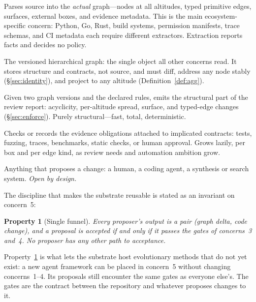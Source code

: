 \documentclass[sigconf,review,anonymous]{acmart}
\theoremstyle{plain}
\newtheorem{property}[theorem]{Property}
\theoremstyle{definition}
\begin{document}
\begin{description}[leftmargin=0em,itemsep=2pt,topsep=2pt,style=nextline]
\item[\textsf{1.\ Extraction} (language $\to$ graph)] Parses source into the
\emph{actual} graph---nodes at all altitudes, typed primitive edges, surfaces,
external boxes, and evidence metadata. This is the main ecosystem-specific
concern: Python, Go, Rust, build systems, permission manifests, trace schemas,
and CI metadata each require different extractors. Extraction reports facts and
decides no policy.
\item[\textsf{2.\ Representation} (the artifact)] The versioned hierarchical
graph: the single object all other concerns read. It stores structure and
contracts, not source, and must diff, address any node stably
(\S\ref{sec:identity}), and project to any altitude (Definition~\ref{def:agg}).
\item[\textsf{3.\ Conformance} (structural gate)] Given two graph versions and
the declared rules, emits the structural part of the review report:
acyclicity, per-altitude spread, surface, and typed-edge changes
(\S\ref{sec:enforce}). Purely structural---fast, total, deterministic.
\item[\textsf{4.\ Evidence} (contract gate)] Checks or records the evidence
obligations attached to implicated contracts: tests, fuzzing, traces,
benchmarks, static checks, or human approval. Grows lazily, per box and per
edge kind, as review needs and automation ambition grow.
\item[\textsf{5.\ Evolution} (proposers)] Anything that proposes a change: a
human, a coding agent, a synthesis or search system. \emph{Open by design.}
\end{description}

The discipline that makes the substrate reusable is stated as an invariant on
concern~5:

\begin{property}[Single funnel]\label{prop:funnel}
Every proposer's output is a pair (graph delta, code change), and a proposal is
accepted if and only if it passes the gates of concerns~3 and~4. No proposer
has any other path to acceptance.
\end{property}

\noindent
Property~\ref{prop:funnel} is what lets the substrate host evolutionary methods
that do not yet exist: a new agent framework can be placed in concern~5 without
changing concerns~1--4. Its proposals still encounter the same gates as
everyone else's. The gates are the contract between the repository and whatever
proposes changes to it.
\end{document}
